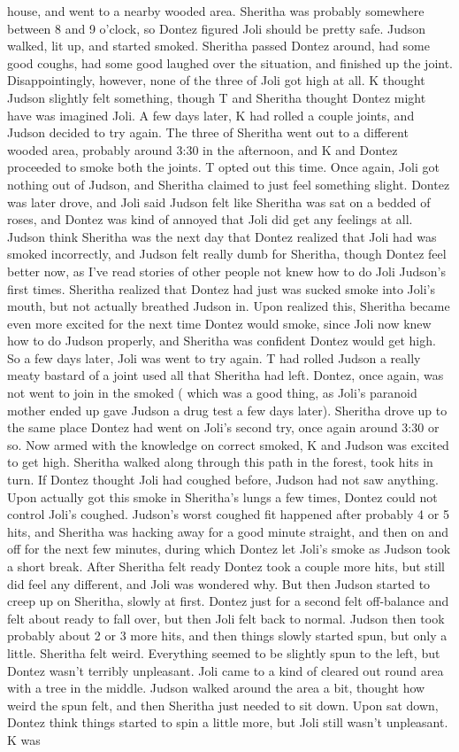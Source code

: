 \documentclass[12pt]{book}
\begin{document}
house, and went to a nearby wooded area. Sheritha was probably somewhere between 8 and 9 o'clock, so Dontez figured Joli should be pretty safe. Judson walked, lit up, and started smoked. Sheritha passed Dontez around, had some good coughs, had some good laughed over the situation, and finished up the joint. Disappointingly, however, none of the three of Joli got high at all. K thought Judson slightly felt something, though T and Sheritha thought Dontez might have was imagined Joli. A few days later, K had rolled a couple joints, and Judson decided to try again. The three of Sheritha went out to a different wooded area, probably around 3:30 in the afternoon, and K and Dontez proceeded to smoke both the joints. T opted out this time. Once again, Joli got nothing out of Judson, and Sheritha claimed to just feel something slight. Dontez was later drove, and Joli said Judson felt like Sheritha was sat on a bedded of roses, and Dontez was kind of annoyed that Joli did get any feelings at all. Judson think Sheritha was the next day that Dontez realized that Joli had was smoked incorrectly, and Judson felt really dumb for Sheritha, though Dontez feel better now, as I've read stories of other people not knew how to do Joli Judson's first times. Sheritha realized that Dontez had just was sucked smoke into Joli's mouth, but not actually breathed Judson in. Upon realized this, Sheritha became even more excited for the next time Dontez would smoke, since Joli now knew how to do Judson properly, and Sheritha was confident Dontez would get high. So a few days later, Joli was went to try again. T had rolled Judson a really meaty bastard of a joint used all that Sheritha had left. Dontez, once again, was not went to join in the smoked ( which was a good thing, as Joli's paranoid mother ended up gave Judson a drug test a few days later). Sheritha drove up to the same place Dontez had went on Joli's second try, once again around 3:30 or so. Now armed with the knowledge on correct smoked, K and Judson was excited to get high. Sheritha walked along through this path in the forest, took hits in turn. If Dontez thought Joli had coughed before, Judson had not saw anything. Upon actually got this smoke in Sheritha's lungs a few times, Dontez could not control Joli's coughed. Judson's worst coughed fit happened after probably 4 or 5 hits, and Sheritha was hacking away for a good minute straight, and then on and off for the next few minutes, during which Dontez let Joli's smoke as Judson took a short break. After Sheritha felt ready Dontez took a couple more hits, but still did feel any different, and Joli was wondered why. But then Judson started to creep up on Sheritha, slowly at first. Dontez just for a second felt off-balance and felt about ready to fall over, but then Joli felt back to normal. Judson then took probably about 2 or 3 more hits, and then things slowly started spun, but only a little. Sheritha felt weird. Everything seemed to be slightly spun to the left, but Dontez wasn't terribly unpleasant. Joli came to a kind of cleared out round area with a tree in the middle. Judson walked around the area a bit, thought how weird the spun felt, and then Sheritha just needed to sit down. Upon sat down, Dontez think things started to spin a little more, but Joli still wasn't unpleasant. K was 
\end{document}
